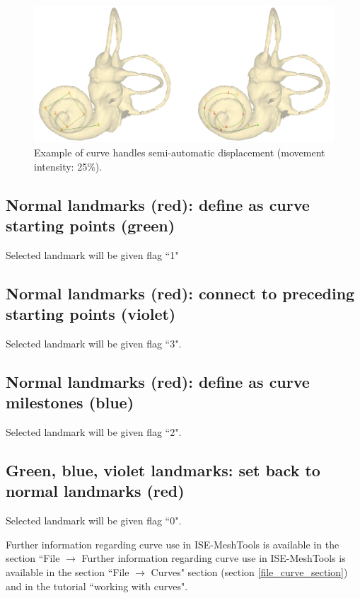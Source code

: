 \begin{figure}
  \centering
  \includegraphics[scale=0.25]{images/Edit_selected_landmarks/Move_selected_handles_input_output.png} 
	\caption{Example of curve handles semi-automatic displacement (movement intensity: 25\%).}
\label{move_handles2}
 
\end{figure}





\subsection{Normal landmarks (red): define as curve starting points (green)}
Selected landmark will be given flag ``1"


\subsection{Normal landmarks (red): connect to preceding starting points (violet)}
Selected landmark will be given flag ``3".


\subsection{Normal landmarks (red): define as curve milestones (blue)}
Selected landmark will be given flag ``2".

\subsection{Green, blue, violet landmarks: set back to normal landmarks (red)}
Selected landmark will be given flag ``0".

\noindent Further information regarding curve use in ISE-MeshTools is available in the section ``File $\rightarrow$
\noindent Further information regarding curve use in ISE-MeshTools is available in the section ``File $\rightarrow$
Curves" section (section \ref{file_curve_section}) and in the tutorial ``working with curves".